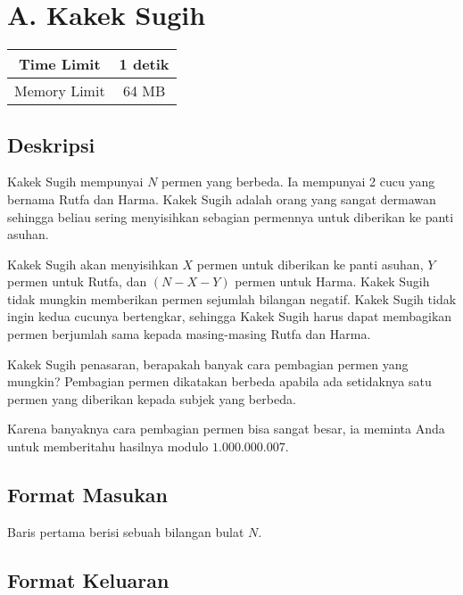 \documentclass{article}
\begin{document}
\section*{\hfil A. Kakek Sugih\hfil}

\begin{center}
\begin{tabular}{ |cc| } 
 \hline
 Time Limit & 1 detik \\ 
 \hline
 Memory Limit & 64 MB \\
 \hline
\end{tabular}
\end{center}

\subsection*{Deskripsi}

\par\indent Kakek Sugih mempunyai $N$ permen yang berbeda. Ia mempunyai 2 cucu yang bernama Rutfa dan Harma. Kakek Sugih adalah orang yang sangat dermawan sehingga beliau sering menyisihkan sebagian permennya untuk diberikan ke panti asuhan. 

\par Kakek Sugih akan menyisihkan $X$ permen untuk diberikan ke panti asuhan, $Y$ permen untuk Rutfa, dan $(N - X - Y)$ permen untuk Harma. Kakek Sugih tidak mungkin memberikan permen sejumlah bilangan negatif. Kakek Sugih tidak ingin kedua cucunya bertengkar, sehingga Kakek Sugih harus dapat membagikan permen berjumlah sama kepada masing-masing Rutfa dan Harma.

\par Kakek Sugih penasaran, berapakah banyak cara pembagian permen yang mungkin? Pembagian permen dikatakan berbeda apabila ada setidaknya satu permen yang diberikan kepada subjek yang berbeda. 

\par Karena banyaknya cara pembagian permen bisa sangat besar, ia meminta Anda untuk memberitahu hasilnya modulo $1.000.000.007$.

\subsection*{Format Masukan}
\par\noindent Baris pertama berisi sebuah bilangan bulat $N$.

\subsection*{Format Keluaran}
\end{document}
